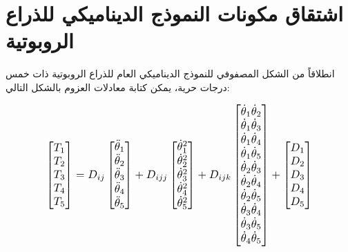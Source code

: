 \section{اشتقاق مكونات النموذج الديناميكي للذراع الروبوتية}

انطلاقاً من الشكل المصفوفي للنموذج الديناميكي العام للذراع الروبوتية ذات خمس درجات حرية، يمكن كتابة معادلات العزوم بالشكل التالي:

\begin{equation}
\resizebox{0.8\textwidth}{!}{$
\begin{bmatrix}
T_1 \\
T_2 \\
T_3 \\
T_4 \\
T_5
\end{bmatrix}
=
D_{ij}
\begin{bmatrix}
\ddot{\theta}_1 \\
\ddot{\theta}_2 \\
\ddot{\theta}_3 \\
\ddot{\theta}_4 \\
\ddot{\theta}_5
\end{bmatrix}
+
D_{ijj}
\begin{bmatrix}
\dot{\theta}_1^{2} \\
\dot{\theta}_2^{2} \\
\dot{\theta}_3^{2} \\
\dot{\theta}_4^{2} \\
\dot{\theta}_5^{2}
\end{bmatrix}
+
D_{ijk}
\begin{bmatrix}
\dot{\theta}_1\dot{\theta}_2 \\
\dot{\theta}_1\dot{\theta}_3 \\
\dot{\theta}_1\dot{\theta}_4 \\
\dot{\theta}_1\dot{\theta}_5 \\
\dot{\theta}_2\dot{\theta}_3 \\
\dot{\theta}_2\dot{\theta}_4 \\
\dot{\theta}_2\dot{\theta}_5 \\
\dot{\theta}_3\dot{\theta}_4 \\
\dot{\theta}_3\dot{\theta}_5 \\
\dot{\theta}_4\dot{\theta}_5
\end{bmatrix}
+
\begin{bmatrix}
D_1 \\
D_2 \\
D_3 \\
D_4 \\
D_5
\end{bmatrix}
$}
\end{equation}

